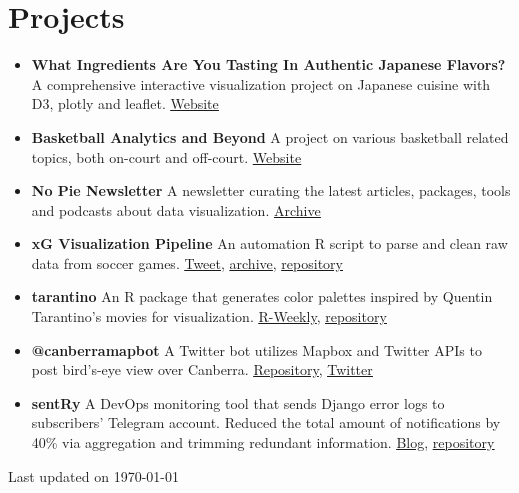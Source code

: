 \documentclass[letterpaper,10pt]{article}
\newcommand{\resumeItem}[2]{
  \item\small{
    \textbf{#1}{ #2 \vspace{-2pt}}
  }
}
\newcommand{\resumeSubItem}[2]{\resumeItem{#1}{#2}\vspace{-4pt}}
\newcommand{\resumeSubHeadingListStart}{\begin{itemize}[leftmargin=*]}
\newcommand{\resumeSubHeadingListEnd}{\end{itemize}}
\newcommand{\updateinfo}[1][\today]{\par\vfill\hfill{\scriptsize Last updated on #1}}
\begin{document}
\section{Projects}
  \resumeSubHeadingListStart
    \resumeSubItem{What Ingredients Are You Tasting In Authentic Japanese Flavors?}{A comprehensive interactive visualization project on Japanese cuisine with D3, plotly and leaflet.}\href{https://celeritasml.github.io/project-japanese-cuisine/}{\underline{Website}}
  	\resumeSubItem{Basketball Analytics and Beyond}{A project on various basketball related topics, both on-court and off-court.}\href{https://rexarski.github.io/bba}{\underline{Website}}
    \resumeSubItem{No Pie Newsletter}{A newsletter curating the latest articles, packages, tools and podcasts about data visualization.}\href{https://github.com/rexarski/2nd-blog/tree/main/content/nopie}{\underline{Archive}}
    \resumeSubItem{xG Visualization Pipeline}
      {An automation R script to parse and clean raw data from soccer games.}\href{https://twitter.com/rexarski/status/1377860255271428097?s=20&t=TgdEjpB-rq6nS0eOTtt32A}{\underline{Tweet}}, \href{https://github.com/rexarski/2nd-blog/blob/main/content/posts/2021-04-07-visualize-xg.md}{\underline{archive}}, \href{https://github.com/rexarski/box2box}{\underline{repository}}
    \resumeSubItem{tarantino}
      {An R package that generates color palettes inspired by Quentin Tarantino’s movies for visualization.}\href{https://rweekly.org/2021-W14.html}{\underline{R-Weekly}}, \href{https://github.com/rexarski/tarantino}{\underline{repository}}
    \resumeSubItem{@canberramapbot}{A Twitter bot utilizes Mapbox and Twitter APIs to post bird’s-eye view over Canberra.}\href{https://github.com/rexarski/canberramapbot}{\underline{Repository}}, \href{https://twitter.com/canberramapbot}{\underline{Twitter}}
    \resumeSubItem{sentRy}
      {A DevOps monitoring tool that sends Django error logs to subscribers’ Telegram account. Reduced the total amount of notifications by 40\% via aggregation and trimming redundant information.}\href{https://github.com/rexarski/2nd-blog/blob/main/content/posts/2020-02-14-sentry.md}{\underline{Blog}}, \href{https://github.com/rexarski/sentRy}{\underline{repository}}
  \resumeSubHeadingListEnd

  \updateinfo[\today]

\end{document}

